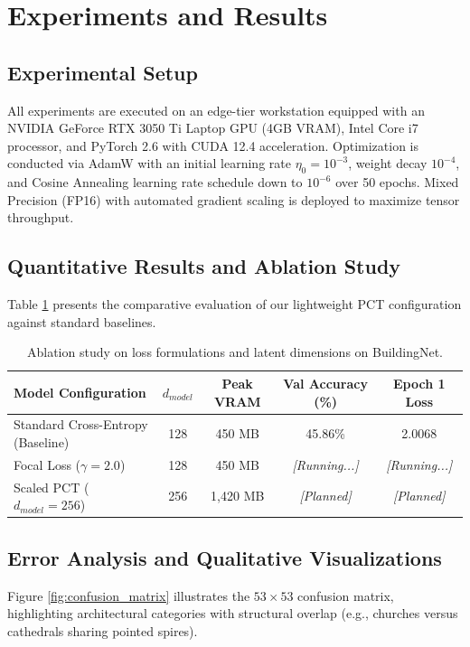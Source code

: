 \section{Experiments and Results}
\label{sec:experiments}

\subsection{Experimental Setup}
All experiments are executed on an edge-tier workstation equipped with an NVIDIA GeForce RTX 3050 Ti Laptop GPU (4GB VRAM), Intel Core i7 processor, and PyTorch 2.6 with CUDA 12.4 acceleration. Optimization is conducted via AdamW with an initial learning rate $\eta_0 = 10^{-3}$, weight decay $10^{-4}$, and Cosine Annealing learning rate schedule down to $10^{-6}$ over 50 epochs. Mixed Precision (FP16) with automated gradient scaling is deployed to maximize tensor throughput.

\subsection{Quantitative Results and Ablation Study}
Table \ref{tab:ablation} presents the comparative evaluation of our lightweight PCT configuration against standard baselines.

\begin{table}[htbp]
\centering
\caption{Ablation study on loss formulations and latent dimensions on BuildingNet.}
\label{tab:ablation}
\begin{tabular}{lcccc}
\toprule
Model Configuration & $d_{model}$ & Peak VRAM & Val Accuracy (\%) & Epoch 1 Loss \\
\midrule
Standard Cross-Entropy (Baseline) & 128 & 450 MB & 45.86\% & 2.0068 \\
Focal Loss ($\gamma = 2.0$) & 128 & 450 MB & \textit{[Running...]} & \textit{[Running...]} \\
Scaled PCT ($d_{model} = 256$) & 256 & 1,420 MB & \textit{[Planned]} & \textit{[Planned]} \\
\bottomrule
\end{tabular}
\end{table}

\subsection{Error Analysis and Qualitative Visualizations}
Figure \ref{fig:confusion_matrix} illustrates the $53 \times 53$ confusion matrix, highlighting architectural categories with structural overlap (e.g., churches versus cathedrals sharing pointed spires).
